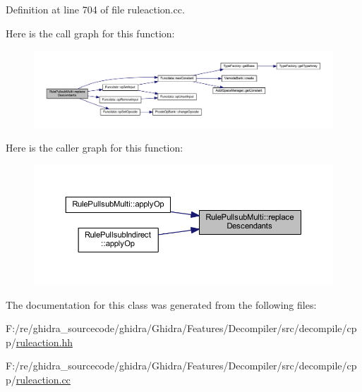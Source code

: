 Definition at line 704 of file ruleaction.\+cc.

Here is the call graph for this function\+:
\nopagebreak
\begin{figure}[H]
\begin{center}
\leavevmode
\includegraphics[width=350pt]{class_rule_pullsub_multi_a913ef535547efd0f181a08dfff49beab_cgraph}
\end{center}
\end{figure}
Here is the caller graph for this function\+:
\nopagebreak
\begin{figure}[H]
\begin{center}
\leavevmode
\includegraphics[width=350pt]{class_rule_pullsub_multi_a913ef535547efd0f181a08dfff49beab_icgraph}
\end{center}
\end{figure}


The documentation for this class was generated from the following files\+:\begin{DoxyCompactItemize}
\item 
F\+:/re/ghidra\+\_\+sourcecode/ghidra/\+Ghidra/\+Features/\+Decompiler/src/decompile/cpp/\mbox{\hyperlink{ruleaction_8hh}{ruleaction.\+hh}}\item 
F\+:/re/ghidra\+\_\+sourcecode/ghidra/\+Ghidra/\+Features/\+Decompiler/src/decompile/cpp/\mbox{\hyperlink{ruleaction_8cc}{ruleaction.\+cc}}\end{DoxyCompactItemize}
